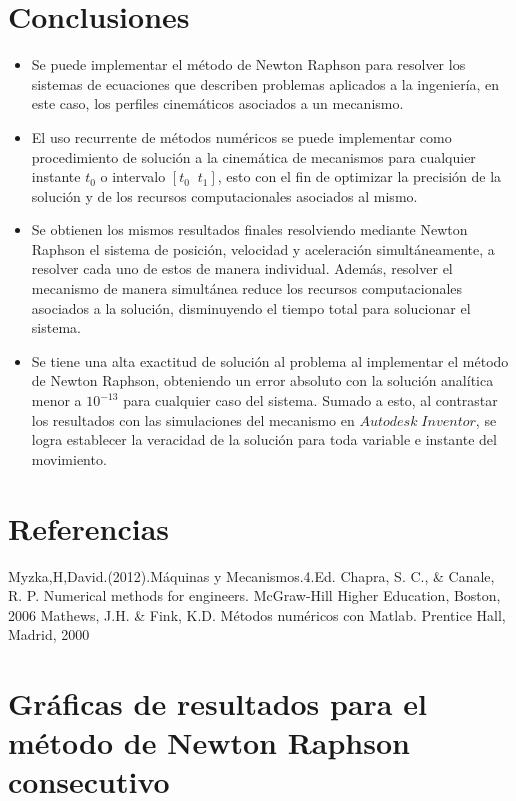 \documentclass[12pt]{article}
\begin{document}
\section{Conclusiones}
\begin{itemize}
    \item Se puede implementar el método de Newton Raphson para resolver los sistemas de ecuaciones que describen problemas aplicados a la ingeniería, en este caso, los perfiles cinemáticos asociados a un mecanismo.
    \item El uso recurrente de métodos numéricos se puede implementar como procedimiento de solución a la cinemática de mecanismos para cualquier instante $t_0$ o intervalo $[t_0\;\;t_1]$, esto con el fin de optimizar la precisión de la solución y de los recursos computacionales asociados al mismo.
    \item Se obtienen los mismos resultados finales resolviendo mediante Newton Raphson el sistema de posición, velocidad y aceleración simultáneamente, a resolver cada uno de estos de manera individual. Además, resolver el mecanismo de manera simultánea reduce los recursos computacionales asociados a la solución, disminuyendo el tiempo total para solucionar el sistema.
    \item Se tiene una alta exactitud de solución al problema al implementar el método de Newton Raphson, obteniendo un error absoluto con la solución analítica menor a $10^{-13}$ para cualquier caso del sistema. Sumado a esto, al contrastar los resultados con las simulaciones del mecanismo en $Autodesk\;Inventor$, se logra establecer la veracidad de la solución para toda variable e instante del movimiento.
\end{itemize}
\section{Referencias}
\color{white}
\begin{thebibliography}{}
\vspace{-30pt}
\color{black}
Myzka,H,David.(2012).Máquinas y Mecanismos.4.Ed.
Chapra, S. C., \& Canale, R. P.  Numerical methods for engineers. McGraw-Hill Higher Education,  Boston, 2006
Mathews, J.H. \& Fink, K.D. Métodos numéricos con Matlab. Prentice Hall,  Madrid, 2000

\end{thebibliography}


\newpage
\color{black}
\appendix
\section{Gráficas de resultados para el método de Newton Raphson consecutivo} \label{NRconsecutivo}
\end{document}
